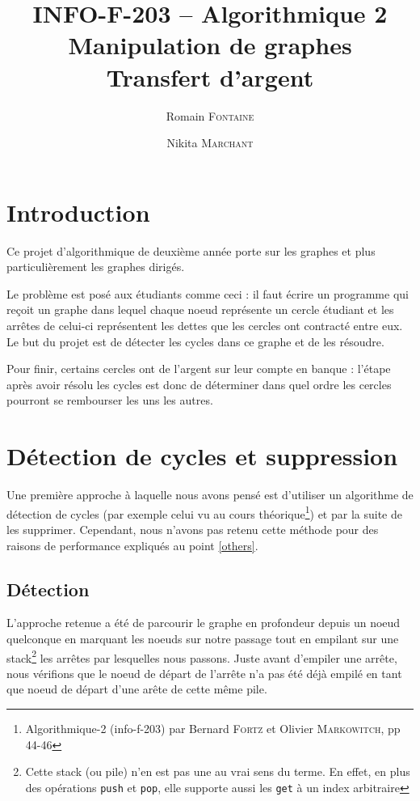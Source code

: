 \documentclass[12pt, oneside]{article}
\title{{\normalsize{INFO-F-203 -- Algorithmique 2}}\\Manipulation de graphes\\ Transfert d’argent}
\author{Romain \textsc{Fontaine} \and Nikita \textsc{Marchant}}
\begin{document}
\maketitle

\section{Introduction}

Ce projet d'algorithmique de deuxième année porte sur les graphes et plus particulièrement les graphes dirigés.

Le problème est posé aux étudiants comme ceci : il faut écrire un programme qui reçoit un graphe dans lequel chaque noeud représente un cercle étudiant et les arrêtes de celui-ci représentent les dettes que les cercles ont contracté entre eux. Le but du projet est de détecter les cycles dans ce graphe et de les résoudre.

Pour finir, certains cercles ont de l'argent sur leur compte en banque : l'étape après avoir résolu les cycles est donc de déterminer dans quel ordre les cercles pourront se rembourser les uns les autres.


\section{Détection de cycles et suppression}
Une première approche à laquelle nous avons pensé est d'utiliser un algorithme de détection de cycles (par exemple celui vu au cours théorique\footnote{Algorithmique-2 (info-f-203) par Bernard \textsc{Fortz} et Olivier \textsc{Markowitch}, pp 44-46}) et par la suite de les supprimer. Cependant, nous n'avons pas retenu cette méthode pour des raisons de performance expliqués au point \ref{others}.

\subsection{Détection}
\label{detect}
L'approche retenue a été de parcourir le graphe en profondeur depuis un noeud quelconque en marquant les noeuds sur notre passage tout en empilant sur une stack\footnote{Cette stack (ou pile) n'en  est pas une au vrai sens du terme. En effet, en plus des opérations \texttt{push} et \texttt{pop}, elle supporte aussi les \texttt{get} à un index arbitraire} les arrêtes par lesquelles nous passons. Juste avant d'empiler une arrête, nous vérifions que le noeud de départ de l'arrête n'a pas été déjà empilé en tant que noeud de départ d'une arête de cette même pile.
\end{document}
